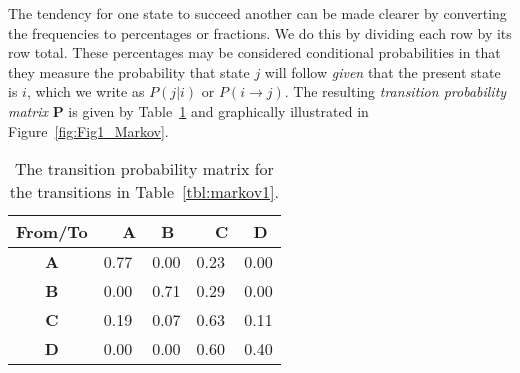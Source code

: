 \begin{example}
	The tendency for one state to succeed another can be made clearer by converting the 
frequencies to percentages or fractions.  We do this by dividing each row by its row total.  These 
percentages may be considered conditional probabilities in that they measure the probability 
that state $j$ will follow \emph{given} that the present state is $i$, which we write as
$P(j|i)$ or $P(i \rightarrow  j)$.  The resulting \emph{transition probability matrix} $\mathbf{P}$
is given by Table~\ref{tbl:markov2} and graphically
illustrated in Figure~\ref{fig:Fig1_Markov}.
\begin{table}[h]
\center
\begin{tabular}{|c|l|l|l|l|}
\hline
\bf{From/To} & \ \ \bf{A}  & \  \bf{B}  & \ \ \bf{C}  & \  \bf{D} \\ \hline
\bf{A} & 0.77 & 0.00 & 0.23 & 0.00 \\ \hline
\bf{B} & 0.00 & 0.71 & 0.29 & 0.00 \\ \hline
\bf{C} & 0.19 & 0.07 & 0.63 & 0.11 \\ \hline
\bf{D} & 0.00 & 0.00 & 0.60 & 0.40 \\ \hline
\end{tabular}
\caption{The transition probability matrix for the transitions in Table~\ref{tbl:markov1}.}
\label{tbl:markov2}
\end{table}



\end{example}
